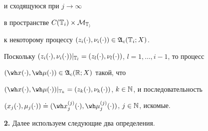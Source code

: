 \begin{pf}
и сходящуюся при $j\to\infty$


в пространстве $C(\Bbb T_i)\times\cal M_{\Bbb T_i}$


к некоторому процессу $(z_i(\cdot),\nu_i(\cdot))\in\frak A_c(\Bbb T_i;X)$.


Поскольку $(z_i(\cdot),\nu_i(\cdot))|_{\Bbb T_l}=


(z_l(\cdot),\nu_l(\cdot))$, $l=1,\dotsc,i-1$, то процесс


$(\wh x(\cdot),\wh\mu(\cdot))\in\frak A_c(\Bbb R;X)$ такой, что


$(\wh x(\cdot),\wh\mu(\cdot))|_{\Bbb T_k}=


(z_k(\cdot),\nu_k(\cdot))$, $k\in\Bbb N$, и последовательность


$(x_j(\cdot),\mu_j(\cdot))\doteq(\wh x_j^{(j)}(\cdot),


\wh\mu_j^{(j)}(\cdot))$, $j\in\Bbb N$, искомые.


\end{pf}





\addtocounter{section}{1}


\setcounter{equation}{0}


\setcounter{footnote}{0}


\setcounter{lems}{0}


\setcounter{defns}{0}


\setcounter{notes}{0}


\setcounter{thms}{0}





{\bf 2.} Далее используем следующие два определения.









